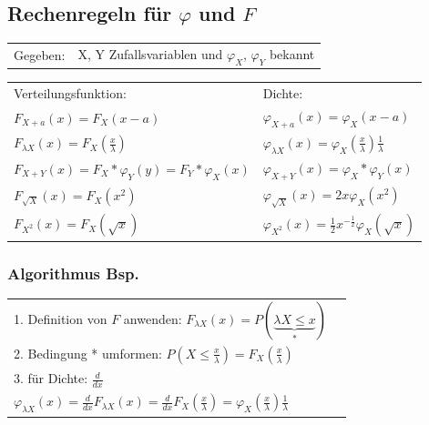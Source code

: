 	\subsection{Rechenregeln für $\varphi$ und $F$ }
		\begin{minipage}{11cm}
			\begin{tabular}{ll}
        	Gegeben: &X, Y Zufallsvariablen und $\varphi_X$, $\varphi_Y$ bekannt\\
        	\end{tabular}
 
        	\begin{tabular}{p{6cm}p{6cm}}
        	Verteilungsfunktion: &Dichte:\\
        	$F_{X+a}(x)=F_X(x-a)$  &$\varphi_{X+a}(x)=\varphi_X(x-a)$\\
        	$F_{\lambda X}(x)=F_X(\frac{x}{\lambda})$ &$\varphi_{\lambda
        	X}(x)=\varphi_X(\frac{x}{\lambda})\frac{1}{\lambda}$\\
        	$F_{X+Y}(x)=F_X\ast\varphi_Y(y)=F_Y\ast\varphi_X(x)$ &
        	$\varphi_{X+Y}(x)=\varphi_X\ast\varphi_Y(x)$\\
        	$F_{\sqrt{X}}(x)=F_X(x^2)$ &
        	$\varphi_{\sqrt{X}}(x)=2x\varphi_X(x^2)$\\
        	$F_{X^2}(x)=F_X(\sqrt{x})$ &
        	$\varphi_{X^2}(x)=\frac{1}{2}x^{-\frac{1}{2}}\varphi_X(\sqrt{x})$
        	\end{tabular}
		\end{minipage}
		\begin{minipage}{7cm}
        	\subsubsection{Algorithmus Bsp.}
        	\begin{tabular}{ll}
        	1. Definition von $F$ anwenden: $F_{\lambda X}(x)=P(\underbrace
        	{\lambda X\leq x}_{*})$\\ 
        	2. Bedingung * umformen: $P(X \leq
        	\frac{x}{\lambda})=F_X(\frac{x}{\lambda})$\\ 
        	3. für Dichte: $\frac{d}{dx}$\\
        	\vspace{3mm}
        	$\varphi_{\lambda X}(x)=\frac{d}{dx}F_{\lambda
        	X}(x)=\frac{d}{dx}F_X(\frac{x}{\lambda})=
        	\varphi_X(\frac{x}{\lambda})\frac{1}{\lambda}$
        	\end{tabular}
			\vspace{10mm}
        \end{minipage}
